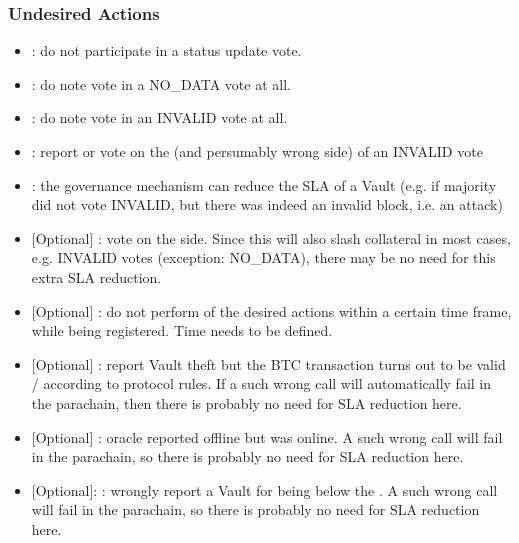 \documentclass[a4paper,10pt,english]{sphinxmanual}
\begin{document}
\subsubsection{Undesired Actions}
\label{\detokenize{economics/SLA:id9}}\begin{itemize}
\item {} 
: do not participate in a status update vote.

\item {} 
: do note vote in a NO\_DATA vote at all.

\item {} 
: do note vote in an INVALID vote at all.

\item {} 
: report or vote on the  (and persumably wrong side) of an INVALID vote

\item {} 
: the governance mechanism can reduce the SLA of a Vault (e.g. if majority did not vote INVALID, but there was indeed an invalid block, i.e. an attack)

\item {} 
{[}Optional{]} : vote on the  side.
\sphinxhyphen{} Since this will also slash collateral in most cases, e.g. INVALID votes (exception: NO\_DATA), there may be no need for this extra SLA reduction.

\item {} 
{[}Optional{]} : do not perform  of the desired actions within a certain time frame, while being registered. Time needs to be defined.

\item {} 
{[}Optional{]} : report Vault theft but the BTC transaction turns out to be valid / according to protocol rules.
\sphinxhyphen{} If a such wrong call will automatically fail in the parachain, then there is probably no need for SLA reduction here.

\item {} 
{[}Optional{]} : oracle reported offline but was online. A such wrong call will fail in the parachain, so there is probably no need for SLA reduction here.

\item {} 
{[}Optional{]}: : wrongly report a Vault for being below the .  A such wrong call will fail in the parachain, so there is probably no need for SLA reduction here.

\end{itemize}
\end{document}

